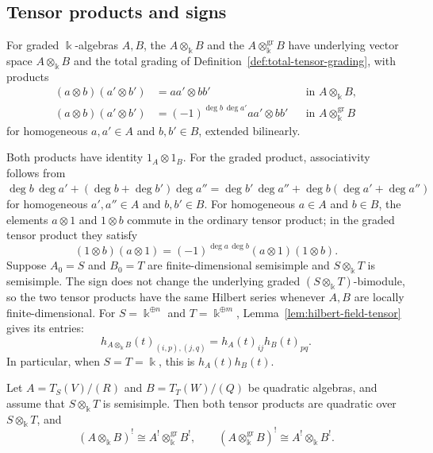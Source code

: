 \begin{advanced}[suppressfirstparskip=true,innertopmargin=0pt]
\subsection{Tensor products and signs}

\begin{definition}\label{def:algebra-tensor-products}
For graded $\Bbbk$-algebras $A,B$, the  $A\otimes_\Bbbk B$ and the  $A\otimes_\Bbbk^{\mathrm{gr}}B$ have underlying vector space $A\otimes_\Bbbk B$ and the total grading of Definition~\ref{def:total-tensor-grading}, with products
\begin{equation}\label{eq:signed-tensor-product}
\begin{aligned}
(a\otimes b)(a'\otimes b')&=aa'\otimes bb'
&&\text{in }A\otimes_\Bbbk B,\\
(a\otimes b)(a'\otimes b')&=(-1)^{\deg b\,\deg a'}aa'\otimes bb'
&&\text{in }A\otimes_\Bbbk^{\mathrm{gr}}B
\end{aligned}
\end{equation}
for homogeneous $a,a'\in A$ and $b,b'\in B$, extended bilinearly.
\end{definition}

Both products have identity $1_A\otimes1_B$.
For the graded product, associativity follows from
$\deg b\,\deg a'+(\deg b+\deg b')\deg a''=\deg b'\,\deg a''+\deg b(\deg a'+\deg a'')$
for homogeneous $a',a''\in A$ and $b,b'\in B$.
For homogeneous $a\in A$ and $b\in B$, the elements $a\otimes1$ and $1\otimes b$ commute in the ordinary tensor product; in the graded tensor product they satisfy
\[
(1\otimes b)(a\otimes1)=(-1)^{\deg a\,\deg b}(a\otimes1)(1\otimes b).
\]
Suppose $A_0=S$ and $B_0=T$ are finite-dimensional semisimple and $S\otimes_\Bbbk T$ is semisimple.
The sign does not change the underlying graded $(S\otimes_\Bbbk T)$-bimodule, so the two tensor products have the same Hilbert series whenever $A,B$ are locally finite-dimensional.
For $S=\Bbbk^{\oplus n}$ and $T=\Bbbk^{\oplus m}$, Lemma~\ref{lem:hilbert-field-tensor} gives its entries:
\[
h_{A\otimes_\Bbbk B}(t)_{(i,p),(j,q)}
=h_A(t)_{ij}h_B(t)_{pq}.
\]
In particular, when $S=T=\Bbbk$, this is $h_A(t)h_B(t)$.

\begin{proposition}\label{prop:dual-tensor-products}
Let $A=T_S(V)/(R)$ and $B=T_T(W)/(Q)$ be quadratic algebras, and assume that $S\otimes_\Bbbk T$ is semisimple.
Then both tensor products are quadratic over $S\otimes_\Bbbk T$, and
\begin{equation}\label{eq:dual-tensor-products}
(A\otimes_\Bbbk B)^!\cong A^!\otimes_\Bbbk^{\mathrm{gr}}B^!,\qquad
(A\otimes_\Bbbk^{\mathrm{gr}}B)^!\cong A^!\otimes_\Bbbk B^!.
\end{equation}
\end{proposition}


\end{advanced}
